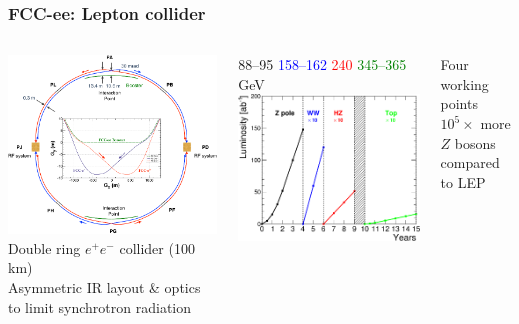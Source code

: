 \documentclass[aspectratio=169]{beamer}
\begin{document}
\begin{frame}
  \frametitle{FCC-ee: Lepton collider}
  \begin{columns}[c]
     \includegraphics[width=0.8\linewidth]{figures/FCC_ee_ring.png}\\
     Double ring $e^+e^-$ collider (100 km)\\
     Asymmetric IR layout \& optics to limit synchrotron radiation\\

     \begin{center}
       {\footnotesize\hspace{3.3em}88--95
                  \hspace{0.2em}\textcolor{blue}{158--162}
                  \hspace{0.2em}\textcolor{red}{240
                  }\hspace{1.9em}\textcolor{green}{345--365} GeV}
      \includegraphics[width=.85\linewidth]{figures/FCC_ee_operation_plan.png}
     \end{center}
     Four working points\\
     $10^5 \times$ more $Z$ bosons compared to LEP\\
  \end{columns}
\end{frame}
\end{document}
